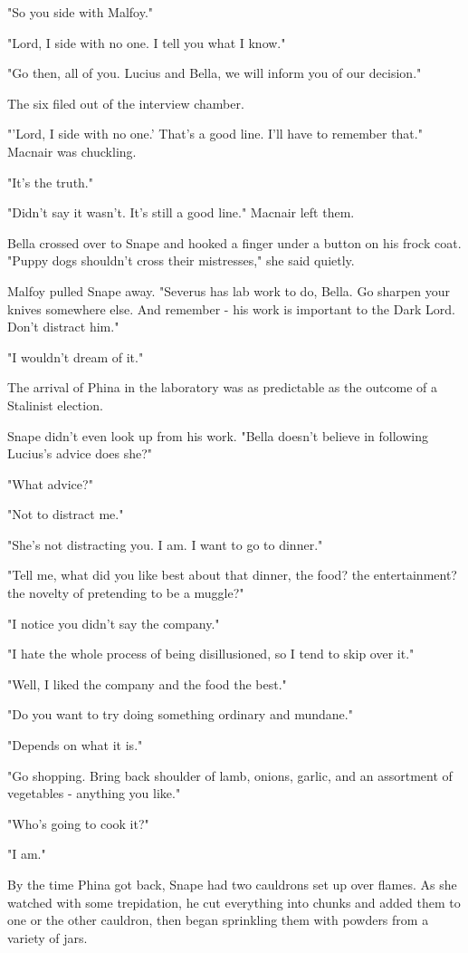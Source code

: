 "So you side with Malfoy."

"Lord, I side with no one. I tell you what I know."

"Go then, all of you. Lucius and Bella, we will inform you of our decision."

The six filed out of the interview chamber.

"'Lord, I side with no one.' That's a good line. I'll have to remember that." Macnair was chuckling.

"It's the truth."

"Didn't say it wasn't. It's still a good line." Macnair left them.

Bella crossed over to Snape and hooked a finger under a button on his frock coat. "Puppy dogs shouldn't cross their mistresses," she said quietly.

Malfoy pulled Snape away. "Severus has lab work to do, Bella. Go sharpen your knives somewhere else. And remember - his work is important to the Dark Lord. Don't distract him."

"I wouldn't dream of it."

The arrival of Phina in the laboratory was as predictable as the outcome of a Stalinist election.

Snape didn't even look up from his work. "Bella doesn't believe in following Lucius's advice does she?"

"What advice?"

"Not to distract me."

"She's not distracting you. I am. I want to go to dinner."

"Tell me, what did you like best about that dinner, the food? the entertainment? the novelty of pretending to be a muggle?"

"I notice you didn't say the company."

"I hate the whole process of being disillusioned, so I tend to skip over it."

"Well, I liked the company and the food the best."

"Do you want to try doing something ordinary and mundane."

"Depends on what it is."

"Go shopping. Bring back shoulder of lamb, onions, garlic, and an assortment of vegetables - anything you like."

"Who's going to cook it?"

"I am."

By the time Phina got back, Snape had two cauldrons set up over flames. As she watched with some trepidation, he cut everything into chunks and added them to one or the other cauldron, then began sprinkling them with powders from a variety of jars.

